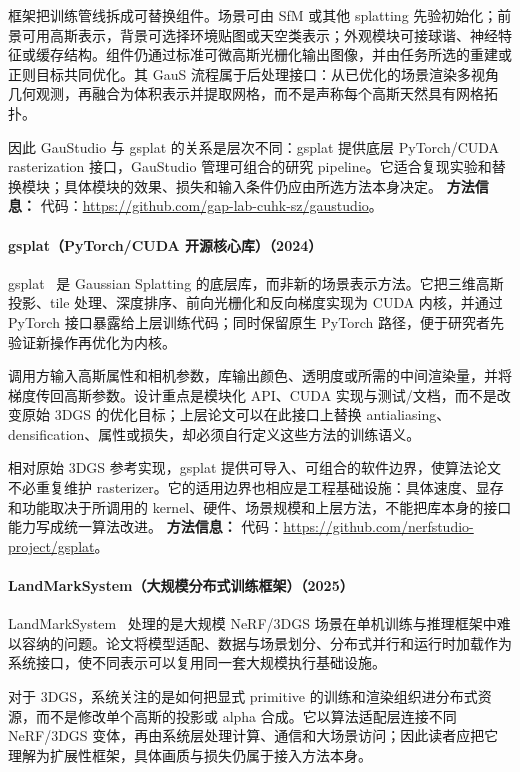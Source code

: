 框架把训练管线拆成可替换组件。场景可由 SfM 或其他 splatting 先验初始化；前景可用高斯表示，背景可选择环境贴图或天空类表示；外观模块可接球谐、神经特征或缓存结构。组件仍通过标准可微高斯光栅化输出图像，并由任务所选的重建或正则目标共同优化。其 GauS 流程属于后处理接口：从已优化的场景渲染多视角几何观测，再融合为体积表示并提取网格，而不是声称每个高斯天然具有网格拓扑。

因此 GauStudio 与 gsplat 的关系是层次不同：gsplat 提供底层 PyTorch/CUDA rasterization 接口，GauStudio 管理可组合的研究 pipeline。它适合复现实验和替换模块；具体模块的效果、损失和输入条件仍应由所选方法本身决定。
\textbf{方法信息：} 代码：\url{https://github.com/gap-lab-cuhk-sz/gaustudio}。
\paragraph{gsplat（PyTorch/CUDA 开源核心库）（2024）}
gsplat~\cite{2409_06765} 是 Gaussian Splatting 的底层库，而非新的场景表示方法。它把三维高斯投影、tile 处理、深度排序、前向光栅化和反向梯度实现为 CUDA 内核，并通过 PyTorch 接口暴露给上层训练代码；同时保留原生 PyTorch 路径，便于研究者先验证新操作再优化为内核。

调用方输入高斯属性和相机参数，库输出颜色、透明度或所需的中间渲染量，并将梯度传回高斯参数。设计重点是模块化 API、CUDA 实现与测试/文档，而不是改变原始 3DGS 的优化目标；上层论文可以在此接口上替换 antialiasing、densification、属性或损失，却必须自行定义这些方法的训练语义。

相对原始 3DGS 参考实现，gsplat 提供可导入、可组合的软件边界，使算法论文不必重复维护 rasterizer。它的适用边界也相应是工程基础设施：具体速度、显存和功能取决于所调用的 kernel、硬件、场景规模和上层方法，不能把库本身的接口能力写成统一算法改进。
\textbf{方法信息：} 代码：\url{https://github.com/nerfstudio-project/gsplat}。
\paragraph{LandMarkSystem（大规模分布式训练框架）（2025）}
LandMarkSystem~\cite{2503_21364} 处理的是大规模 NeRF/3DGS 场景在单机训练与推理框架中难以容纳的问题。论文将模型适配、数据与场景划分、分布式并行和运行时加载作为系统接口，使不同表示可以复用同一套大规模执行基础设施。

对于 3DGS，系统关注的是如何把显式 primitive 的训练和渲染组织进分布式资源，而不是修改单个高斯的投影或 alpha 合成。它以算法适配层连接不同 NeRF/3DGS 变体，再由系统层处理计算、通信和大场景访问；因此读者应把它理解为扩展性框架，具体画质与损失仍属于接入方法本身。

